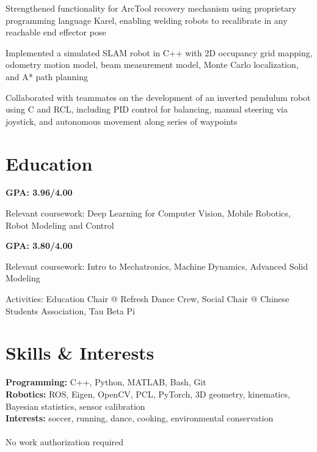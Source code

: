 \documentclass{resume}
\begin{document}
\begin{details}
\item Strengthened functionality for ArcTool recovery mechanism using proprietary
  programming language Karel, enabling welding robots to recalibrate in any reachable end
  effector pose
\end{details}

\begin{details}
\item Implemented a simulated SLAM robot in C++ with 2D occupancy grid mapping, odometry
  motion model, beam measurement model, Monte Carlo localization, and A* path planning
\item Collaborated with teammates on the development of an inverted pendulum robot using
  C and RCL, including PID control for balancing, manual steering via joystick, and
  autonomous movement along series of waypoints
\end{details}

\section{Education}

\begin{details}
\item \textbf{GPA: 3.96/4.00}
\item Relevant coursework: Deep Learning for Computer Vision, Mobile Robotics, Robot
  Modeling and Control
\end{details}

\begin{details}
\item \textbf{GPA: 3.80/4.00}
\item Relevant coursework: Intro to Mechatronics, Machine Dynamics, Advanced Solid Modeling
\item Activities: Education Chair @ Refresh Dance Crew, Social Chair @ Chinese Students
  Association, Tau Beta Pi
\end{details}

\section{Skills \& Interests}
\textbf{Programming:} C++, Python, MATLAB, Bash, Git \\
\textbf{Robotics:} ROS, Eigen, OpenCV, PCL, PyTorch, 3D geometry, kinematics, Bayesian
statistics, sensor calibration \\
\textbf{Interests:} soccer, running, dance, cooking, environmental conservation \\~\\
\textsuperscript{\textasteriskcentered}No work authorization required
\end{document}
